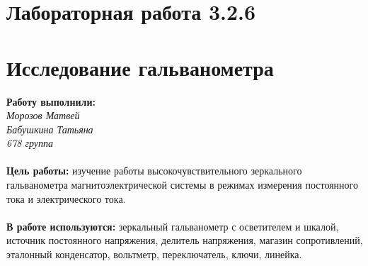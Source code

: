 \documentclass[11pt,a4paper]{article}
\begin{document}
	\part*{Лабораторная работа 3.2.6}
	\part*{Исследование гальванометра}
	\textbf{Работу выполнили:} \\
	{\itshape Морозов Матвей \\ Бабушкина Татьяна \\ 678 группа} \\\\
\textbf{Цель работы:} изучение работы высокочувствительного зеркального гальванометра магнитоэлектрической системы в режимах измерения постоянного тока и электрического тока.
\\\\
\textbf {В работе используются:} зеркальный гальванометр с осветителем и шкалой, источник постоянного напряжения, делитель напряжения, магазин сопротивлений, эталонный конденсатор, вольтметр, переключатель, ключи, линейка.
\\
\\
\end{document}
